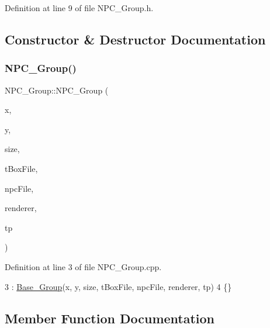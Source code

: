 Definition at line 9 of file N\+P\+C\+\_\+\+Group.\+h.



\subsection{Constructor \& Destructor Documentation}
\mbox{\label{class_n_p_c___group_ab680383cc2de42390440bae5bae6b53e}} 
\subsubsection{\texorpdfstring{N\+P\+C\+\_\+\+Group()}{NPC\_Group()}}
{\footnotesize\ttfamily N\+P\+C\+\_\+\+Group\+::\+N\+P\+C\+\_\+\+Group (\begin{DoxyParamCaption}\item[{int}]{x,  }\item[{int}]{y,  }\item[{int}]{size,  }\item[{std\+::string}]{t\+Box\+File,  }\item[{std\+::string}]{npc\+File,  }\item[{S\+D\+L\+\_\+\+Renderer $\ast$}]{renderer,  }\item[{\hyperlink{class_topic}{Topic}}]{tp }\end{DoxyParamCaption})}



Definition at line 3 of file N\+P\+C\+\_\+\+Group.\+cpp.


\begin{DoxyCode}
3                                                                                                            
              : \hyperlink{class_base___group_a96e70ee101d6430696f7b13b07190787}{Base\_Group}(x, y, size, tBoxFile, npcFile, renderer, tp)
4 \{\}
\end{DoxyCode}


\subsection{Member Function Documentation}
\mbox{\label{class_n_p_c___group_a2e0b8772b42985bd7e87359013918601}} 
